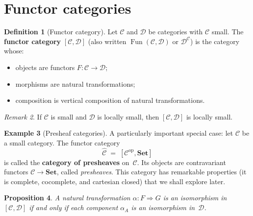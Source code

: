 \documentclass[a4paper,12pt]{book}
\DeclareMathOperator{\Fun}{Fun}
\newcommand{\Set}{\mathbf{Set}}
\newcommand{\op}{\mathrm{op}}
\theoremstyle{definition}
\newtheorem{definition}{Definition}[section]
\newtheorem{example}[definition]{Example}
\theoremstyle{plain}
\newtheorem{proposition}[definition]{Proposition}
\theoremstyle{remark}
\newtheorem{remark}[definition]{Remark}
\begin{document}
\section{Functor categories}\label{sec:functor-categories}

\begin{definition}[Functor category]\label{def:functor-category}
Let $\mathcal{C}$ and $\mathcal{D}$ be categories with $\mathcal{C}$
small.  The \textbf{functor category}
$[\mathcal{C},\mathcal{D}]$ (also written
$\Fun(\mathcal{C},\mathcal{D})$ or $\mathcal{D}^{\mathcal{C}}$) is
the category whose:
\begin{itemize}
    \item objects are functors $F\colon\mathcal{C}\to\mathcal{D}$;
    \item morphisms are natural transformations;
    \item composition is vertical composition of natural
          transformations.
\end{itemize}
\end{definition}

\begin{remark}\label{rem:functor-cat-size}
If $\mathcal{C}$ is small and $\mathcal{D}$ is locally small, then
$[\mathcal{C},\mathcal{D}]$ is locally small.
\end{remark}

\begin{example}[Presheaf categories]\label{ex:presheaf}
A particularly important special case: let $\mathcal{C}$ be a small
category.  The functor category
\[
    \widehat{\mathcal{C}} \;=\; [\mathcal{C}^{\op},\Set]
\]
is called the \textbf{category of presheaves} on~$\mathcal{C}$.  Its
objects are contravariant functors $\mathcal{C}\to\Set$, called
\emph{presheaves}.  This category has remarkable properties (it is
complete, cocomplete, and cartesian closed) that we shall explore later.
\end{example}

\begin{proposition}\label{prop:nat-iso-pointwise}
A natural transformation $\alpha\colon F\Rightarrow G$ is an isomorphism
in $[\mathcal{C},\mathcal{D}]$ if and only if each component
$\alpha_A$ is an isomorphism in~$\mathcal{D}$.
\end{proposition}
\end{document}
